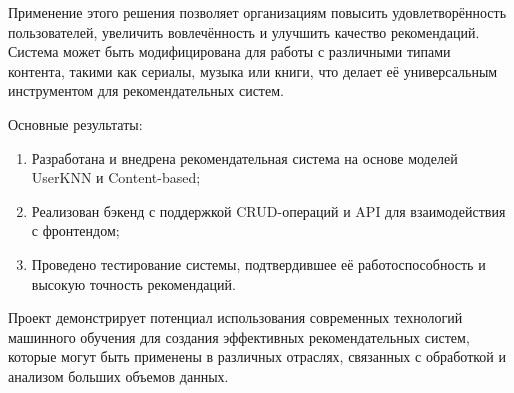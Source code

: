 Применение этого решения позволяет организациям повысить удовлетворённость пользователей, увеличить вовлечённость и улучшить качество рекомендаций. Система может быть модифицирована для работы с различными типами контента, такими как сериалы, музыка или книги, что делает её универсальным инструментом для рекомендательных систем.

Основные результаты:
\begin{enumerate}
    \item Разработана и внедрена рекомендательная система на основе моделей UserKNN и Content-based;
    \item Реализован бэкенд с поддержкой CRUD-операций и API для взаимодействия с фронтендом;
    \item Проведено тестирование системы, подтвердившее её работоспособность и высокую точность рекомендаций.
\end{enumerate}

Проект демонстрирует потенциал использования современных технологий машинного обучения для создания эффективных рекомендательных систем, которые могут быть применены в различных отраслях, связанных с обработкой и анализом больших объемов данных.

\endinput
